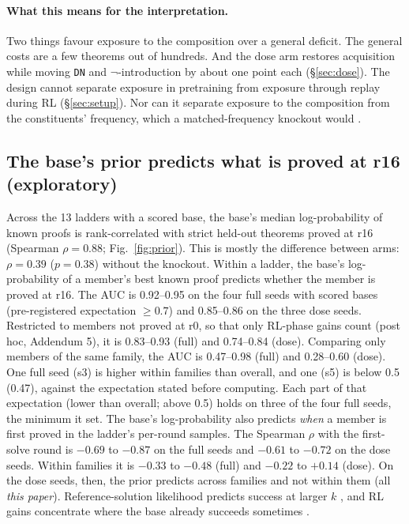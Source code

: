 \paragraph{What this means for the interpretation.} Two things favour exposure to the composition over a general
deficit. The general costs are a few theorems out of hundreds. And the dose arm restores acquisition while moving
\texttt{DN} and $\neg$-introduction by about one point each (\S\ref{sec:dose}). The design cannot separate exposure in
pretraining from exposure through replay during RL (\S\ref{sec:setup}). Nor can it separate exposure to the composition
from the constituents' frequency, which a matched-frequency knockout would \citep{abdulsalam2026rewrite,keysers2020cfq}.

\subsection{The base's prior predicts what is proved at r16 (exploratory)}
\label{sec:prior}

Across the 13 ladders with a scored base, the base's median log-probability of known \sig{} proofs is rank-correlated
with strict held-out theorems proved at r16 (Spearman $\rho = 0.88$; Fig.~\ref{fig:prior}). This is mostly the
difference between arms: $\rho = 0.39$ ($p = 0.38$) without the knockout. Within a ladder, the base's log-probability of
a member's best known proof predicts whether the member is proved at r16. The AUC is 0.92--0.95 on the four full seeds
with scored bases (pre-registered expectation $\geq 0.7$) and 0.85--0.86 on the three dose seeds. Restricted to members
not proved at r0, so that only RL-phase gains count (post hoc, Addendum 5), it is 0.83--0.93 (full) and 0.74--0.84
(dose). Comparing only members
of the same family, the AUC is 0.47--0.98 (full) and 0.28--0.60 (dose). \rv{} One full seed (s3) is higher within families than
overall, and one (s5) is below 0.5 (0.47), against the expectation stated before computing. Each part of that
expectation (lower than overall; above 0.5) holds on three of the four full seeds, the minimum it set. The base's log-probability also predicts \emph{when} a member
is first proved in the ladder's per-round samples. The Spearman $\rho$ with the first-solve round is $-0.69$ to $-0.87$ on
the full seeds and $-0.61$ to $-0.72$ on the dose seeds. Within families it is $-0.33$ to $-0.48$ (full) and $-0.22$ to
$+0.14$ (dose). On the dose seeds, then, the prior predicts across families and not within them (all \emph{this paper}).
Reference-solution likelihood predicts success at larger $k$ \citep{schaeffer2025generative}, and RL gains concentrate
where the base already succeeds sometimes \citep{zhang2025interplay}.

